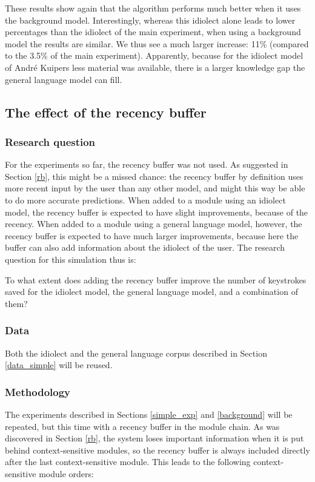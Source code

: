 \documentclass[11pt]{article}
\begin{document}
These results show again that the algorithm performs much better when it uses the background model. Interestingly, whereas this idiolect alone leads to lower percentages than the idiolect of the main experiment, when using a background model the results are similar. We thus see a much larger increase: 11\% (compared to the 3.5\% of the main experiment). Apparently, because for the idiolect model of Andr\'e Kuipers less material was available, there is a larger knowledge gap the general language model can fill.


\subsection{The effect of the recency buffer} \label{recbuf}

\subsubsection{Research question}

For the experiments so far, the recency buffer was not used. As suggested in Section \ref{rb}, this might be a missed chance: the recency buffer by definition uses more recent input by the user than any other model, and might this way be able to do more accurate predictions. When added to a module using an idiolect model, the recency buffer is expected to have slight improvements, because of the recency. When added to a module using a general language model, however, the recency buffer is expected to have much larger improvements, because here the buffer can also add information about the idiolect of the user. The research question for this simulation thus is:

\begin{examples}
\item To what extent does adding the recency buffer improve the number of keystrokes saved for the idiolect model, the general language model, and a combination of them?
\end{examples}

\subsubsection{Data}

Both the idiolect and the general language corpus described in Section \ref{data_simple} will be reused. 

\subsubsection{Methodology}
The experiments described in Sections \ref{simple_exp} and \ref{background} will be repeated, but this time with a recency buffer in the module chain. As was discovered in Section \ref{rb}, the system loses important information when it is put behind context-sensitive modules, so the recency buffer is always included directly after the last context-sensitive module. This leads to the following context-sensitive module orders:
\end{document}
